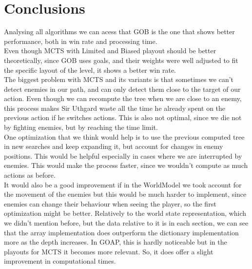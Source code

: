 \documentclass{article}
\begin{document}
  \section{Conclusions}
  Analysing all algorithms we can acess that GOB is the one that shows better performance, both in win rate and processing time.\\
  Even though MCTS with Limited and Biased playout should be better theoretically, since GOB uses goals, and their weights were well adjusted to fit the 
  specific layout of the level, it shows a better win rate.\\
  The biggest problem with MCTS and its variants is that sometimes we can't detect enemies in our path, and can only detect them close to the target of our action.
  Even though we can recompute the tree when we are close to an enemy, this process makes Sir Uthgard waste all the time he already spent on the previous action if he switches
  actions. This is also not optimal, since we die not by fighting enemies, but by reaching the time limit.\\
  One optimization that we think would help is to use the previous computed tree in new searches and keep expanding it, but account for changes in enemy positions. This would be 
  helpful especially in cases where we are interrupted by enemies. 
  This would make the process faster, since we wouldn't compute as much actions as before.\\
  It would also be a good improvement if in the WorldModel we took account for the movement of the enemies but this would be much harder to implement, since enemies can
  change their behaviour when seeing the player, so the first optimization might be better.
  Relatively to the world state representation, which we didn't mention before, but the data relative to it is in each section, we can see that the array implementation 
  does outperform the dictionary implementation more as the depth increases. In GOAP, this is hardly noticeable but in the playouts for MCTS it becomes more relevant. 
  So, it does offer a slight improvement in computational times.
\end{document}
